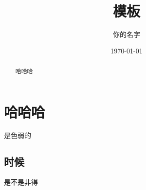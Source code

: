 \documentclass[UTF8,a4paper,10pt]{article}
\begin{document}
\title{模板}
\author{你的名字}
\date{\today}
\maketitle{}
\tableofcontents

\begin{abstract}
  哈哈哈
\end{abstract}
\newpage


\section{哈哈哈}
是色弱的
    \subsection{时候}
是不是非得
\end{document}
